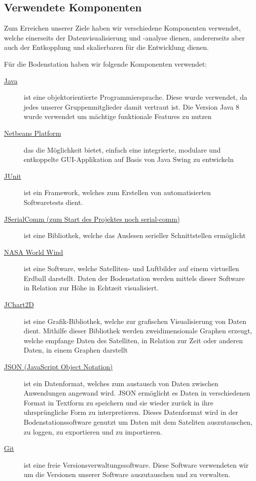 \subsection{Verwendete Komponenten}
Zum Erreichen unserer Ziele haben wir verschiedene Komponenten verwendet, welche einerseits der Datenvisualisierung und -analyse dienen, andererseits aber auch der Entkopplung und skalierbaren für die Entwicklung dienen.

Für die Bodenstation haben wir folgende Komponenten verwendet:
\begin{description}
	\item[\href{http://www.oracle.com/technetwork/java/javase/downloads/jdk8-downloads-2133151.html}{Java}] ist eine objektorientierte Programmiersprache. Diese wurde verwendet, da jedes unserer Gruppenmitglieder damit vertraut ist. Die Version Java 8 wurde verwendet um mächtige funktionale Features zu nutzen
	\item[\href{https://netbeans.org/features/platform/}{Netbeans Platform}] das die Möglichkeit bietet, einfach eine integrierte, modulare und entkoppelte GUI-Applikation auf Basis von Java Swing zu entwickeln
	\item[\href{http://junit.org/}{JUnit}] ist ein Framework, welches zum Erstellen von automatisierten Softwaretests dient.
	\item[\href{http://fazecast.github.io/jSerialComm/}{JSerialComm (zum Start des Projektes noch serial-comm)}] ist eine Bibliothek, welche das Auslesen serieller Schnittstellen ermöglicht 
	\item[\href{http://worldwind.arc.nasa.gov/java/}{NASA World Wind}] ist eine Software, welche Satelliten- und Luftbilder auf einem virtuellen Erdball darstellt. Daten der Bodenstation werden mittels dieser Software in Relation zur Höhe in Echtzeit visualisiert.
	\item[\href{http://jchart2d.sourceforge.net/}{JChart2D}] ist eine Grafik-Bibliothek, welche zur grafischen Visualisierung von Daten dient. Mithilfe dieser Bibliothek werden zweidimensionale Graphen erzeugt, welche empfange Daten des Satelliten, in Relation zur Zeit oder anderen Daten, in einem Graphen darstellt
	\item[\href{http://www.json.org/}{JSON (JavaScript Object Notation)}] ist ein Datenformat, welches zum austausch von Daten zwischen Anwendungen angewand wird. JSON ermöglicht es Daten in verschiedenen Format in Textform zu speichern und sie wieder zurück in ihre uhrsprüngliche Form zu interpretieren. Dieses Datenformat wird in der Bodenstationssoftware genutzt um Daten mit dem Sateliten auszutauschen, zu loggen, zu exportieren und zu importieren.
	\item[\href{http://git-scm.com/}{Git}] ist eine freie Versionsverwaltungssoftware. Diese Software verwendeten wir um die Versionen unserer Software auszutauschen und zu verwalten.
\end{description}